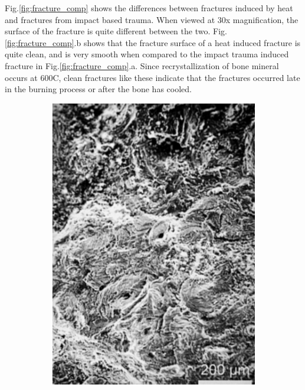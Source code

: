 \documentclass[titlepage]{article}
\begin{document}
Fig.\ref{fig:fracture_comp} shows the differences between fractures induced by heat and fractures from impact based trauma. When viewed at 30x magnification, the surface of the fracture is quite different between the two. Fig.\ref{fig:fracture_comp}.b shows that the fracture surface of a heat induced fracture is quite clean, and is very smooth when compared to the impact trauma induced fracture in Fig.\ref{fig:fracture_comp}.a. Since recrystallization of bone mineral occurs at 600C, clean fractures like these indicate that the fractures occurred late in the burning process or after the bone has cooled.

\newpage
\begin{figure}[h!]
\centering
\begin{subfigure}{.5\textwidth}
  \centering
  \includegraphics[width=.7\linewidth]{unburned_transverse}
  \caption{}
  \end{subfigure}%
\begin{subfigure}{.5\textwidth}
  \centering

\end{subfigure}
\end{figure}
\end{document}
